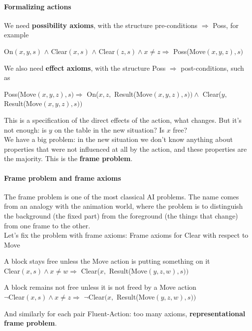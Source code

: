\documentclass[10pt]{report}
\begin{document}
\paragraph{Formalizing actions} We need \textbf{possibility axioms}, with the structure pre-conditions $\Rightarrow$ Poss, for example
\begin{list}{}{}
	\item On$(x,y,s)$ $\wedge$ Clear$(x,s)$ $\wedge$ Clear$(z,s)\wedge x\neq z \Rightarrow$ Poss(Move$(x,y,z),s)$
\end{list}
We also need \textbf{effect axioms}, with the structure Poss $\Rightarrow$ post-conditions, such as
\begin{list}{}{}
	\item Poss(Move$(x,y,z),s)\Rightarrow$ On($x,z,$ Result(Move$(x,y,z),s))\wedge$ Clear($y,$ Result(Move$(x,y,z),s))$
\end{list}
This is a specification of the direct effects of the action, what changes. But it's not enough: is $y$ on the table in the new situation? Is $x$ free?\\
We have a big problem: in the new situation we don't know anything about properties that were not influenced at all by the action, and these properties are the majority. This is the \textbf{frame problem}.
\paragraph{Frame problem and frame axioms} The frame problem is one of the most classical AI problems. The name comes from an analogy with the animation world, where the problem is to distinguish the background (the fixed part) from the foreground (the things that change) from one frame to the other.\\
Let's fix the problem with frame axioms: Frame axioms for Clear with respect to Move
\begin{list}{}{}
	\item A block stays free unless the Move action is putting something on it\\
	Clear$(x,s)\wedge x\neq w\Rightarrow$ Clear($x,$ Result(Move$(y,z,w),s))$
	\item A block remains not free unless it is not freed by a Move action\\
	$\neg$Clear$(x,s)\wedge x\neq z\Rightarrow$ $\neg$Clear$(x,$ Result(Move$(y,z,w),s))$
\end{list}
And similarly for each pair Fluent-Action: too many axioms, \textbf{representational frame problem}.
\end{document}
